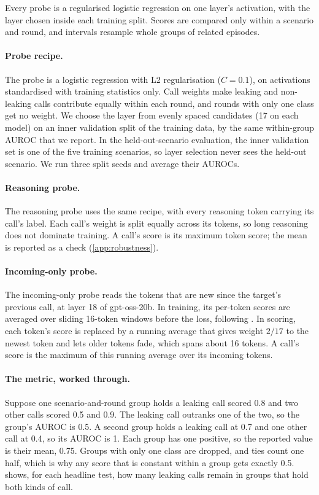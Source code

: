 Every probe is a regularised logistic regression on one layer's activation, with the layer chosen inside each training split.
Scores are compared only within a scenario and round, and intervals resample whole groups of related episodes.

\paragraph{Probe recipe.}
The probe is a logistic regression with L2 regularisation ($C = 0.1$), on activations standardised with training statistics only.
Call weights make leaking and non-leaking calls contribute equally within each round, and rounds with only one class get no weight.
We choose the layer from evenly spaced candidates (17 on each model) on an inner validation split of the training data, by the same within-group AUROC that we report.
In the held-out-scenario evaluation, the inner validation set is one of the five training scenarios, so layer selection never sees the held-out scenario.
We run three split seeds and average their AUROCs.

\paragraph{Reasoning probe.}
The reasoning probe uses the same recipe, with every reasoning token carrying its call's label.
Each call's weight is split equally across its tokens, so long reasoning does not dominate training.
A call's score is its maximum token score; the mean is reported as a check (\cref{app:robustness}).

\paragraph{Incoming-only probe.}
The incoming-only probe reads the tokens that are new since the target's previous call, at layer 18 of gpt-oss-20b.
In training, its per-token scores are averaged over sliding 16-token windows before the loss, following \citet{cunningham2026}.
In scoring, each token's score is replaced by a running average that gives weight $2/17$ to the newest token and lets older tokens fade, which spans about 16 tokens.
A call's score is the maximum of this running average over its incoming tokens.

\paragraph{The metric, worked through.}
Suppose one scenario-and-round group holds a leaking call scored 0.8 and two other calls scored 0.5 and 0.9.
The leaking call outranks one of the two, so the group's AUROC is 0.5.
A second group holds a leaking call at 0.7 and one other call at 0.4, so its AUROC is 1.
Each group has one positive, so the reported value is their mean, 0.75.
Groups with only one class are dropped, and ties count one half, which is why any score that is constant within a group gets exactly 0.5.
 shows, for each headline test, how many leaking calls remain in groups that hold both kinds of call.

